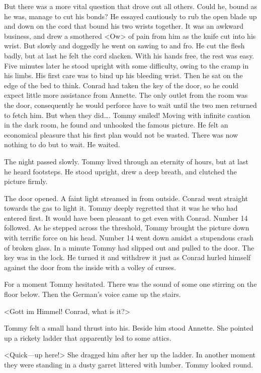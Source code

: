But there was a more vital question that drove out all others. Could he, bound as he was, manage to cut his bonds? He essayed cautiously to rub the open blade up and down on the cord that bound his two wrists together. It was an awkward business, and drew a smothered <Ow> of pain from him as the knife cut into his wrist. But slowly and doggedly he went on sawing to and fro. He cut the flesh badly, but at last he felt the cord slacken. With his hands free, the rest was easy. Five minutes later he stood upright with some difficulty, owing to the cramp in his limbs. His first care was to bind up his bleeding wrist. Then he sat on the edge of the bed to think. Conrad had taken the key of the door, so he could expect little more assistance from Annette. The only outlet from the room was the door, consequently he would perforce have to wait until the two men returned to fetch him. But when they did\dots. Tommy smiled! Moving with infinite caution in the dark room, he found and unhooked the famous picture. He felt an economical pleasure that his first plan would not be wasted. There was now nothing to do but to wait. He waited.

The night passed slowly. Tommy lived through an eternity of hours, but at last he heard footsteps. He stood upright, drew a deep breath, and clutched the picture firmly.

The door opened. A faint light streamed in from outside. Conrad went straight towards the gas to light it. Tommy deeply regretted that it was he who had entered first. It would have been pleasant to get even with Conrad. Number 14 followed. As he stepped across the threshold, Tommy brought the picture down with terrific force on his head. Number 14 went down amidst a stupendous crash of broken glass. In a minute Tommy had slipped out and pulled to the door. The key was in the lock. He turned it and withdrew it just as Conrad hurled himself against the door from the inside with a volley of curses.

For a moment Tommy hesitated. There was the sound of some one stirring on the floor below. Then the German's voice came up the stairs.

<Gott im Himmel! Conrad, what is it?>

Tommy felt a small hand thrust into his. Beside him stood Annette. She pointed up a rickety ladder that apparently led to some attics.

<Quick—up here!> She dragged him after her up the ladder. In another moment they were standing in a dusty garret littered with lumber. Tommy looked round.

